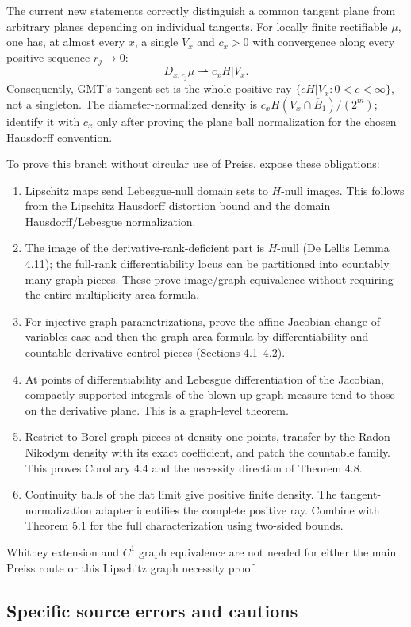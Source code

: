 The current new statements correctly distinguish a common tangent plane
from arbitrary planes depending on individual tangents. For locally finite
rectifiable $\mu$, one has, at almost every $x$, a single $V_x$ and $c_x>0$
with convergence along every positive sequence $r_j\to0$:
\[
D_{x,r_j}\mu\rightharpoonup c_xH|V_x.
\]
Consequently, GMT's tangent set is the whole positive ray
$\{cH|V_x:0<c<\infty\}$, not a singleton. The diameter-normalized density
is $c_x H(V_x\cap\overline B_1)/(2^m)$; identify it with $c_x$ only
after proving the plane ball normalization for the chosen Hausdorff convention.

To prove this branch without circular use of Preiss, expose these obligations:
\begin{enumerate}
\item Lipschitz maps send Lebesgue-null domain sets to $H$-null images.
This follows from the Lipschitz Hausdorff distortion bound and the domain
Hausdorff/Lebesgue normalization.
\item The image of the derivative-rank-deficient part is $H$-null
(De Lellis Lemma 4.11); the full-rank differentiability locus can be partitioned
into countably many graph pieces. These prove image/graph equivalence without
requiring the entire multiplicity area formula.
\item For injective graph parametrizations, prove the affine Jacobian
change-of-variables case and then the graph area formula by differentiability
and countable derivative-control pieces (Sections 4.1--4.2).
\item At points of differentiability and Lebesgue differentiation of the
Jacobian, compactly supported integrals of the blown-up graph measure tend
to those on the derivative plane. This is a graph-level theorem.
\item Restrict to Borel graph pieces at density-one points, transfer by the
Radon--Nikodym density with its exact coefficient, and patch the countable
family. This proves Corollary 4.4 and the necessity direction of Theorem 4.8.
\item Continuity balls of the flat limit give positive finite density.
The tangent-normalization adapter identifies the complete positive ray.
Combine with Theorem 5.1 for the full characterization using two-sided bounds.
\end{enumerate}
Whitney extension and $C^1$ graph equivalence are not needed for either the
main Preiss route or this Lipschitz graph necessity proof.

\subsection{Specific source errors and cautions}

